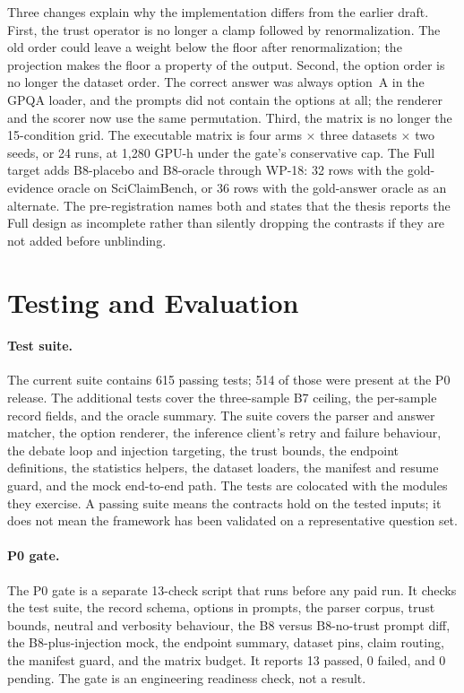 Three changes explain why the implementation differs from the earlier draft. First, the trust operator is no longer a clamp followed by renormalization. The old order could leave a weight below the floor after renormalization; the projection makes the floor a property of the output. Second, the option order is no longer the dataset order. The correct answer was always option~A in the GPQA loader, and the prompts did not contain the options at all; the renderer and the scorer now use the same permutation. Third, the matrix is no longer the 15-condition grid. The executable matrix is four arms $\times$ three datasets $\times$ two seeds, or 24 runs, at 1{,}280 GPU-h under the gate's conservative cap. The Full target adds B8-placebo and B8-oracle through WP-18: 32 rows with the gold-evidence oracle on SciClaimBench, or 36 rows with the gold-answer oracle as an alternate. The pre-registration names both and states that the thesis reports the Full design as incomplete rather than silently dropping the contrasts if they are not added before unblinding.

\section{Testing and Evaluation}\label{sec:testing-evaluation}

\paragraph*{Test suite.}
The current suite contains 615 passing tests; 514 of those were present at the P0 release. The additional tests cover the three-sample B7 ceiling, the per-sample record fields, and the oracle summary. The suite covers the parser and answer matcher, the option renderer, the inference client's retry and failure behaviour, the debate loop and injection targeting, the trust bounds, the endpoint definitions, the statistics helpers, the dataset loaders, the manifest and resume guard, and the mock end-to-end path. The tests are colocated with the modules they exercise. A passing suite means the contracts hold on the tested inputs; it does not mean the framework has been validated on a representative question set.

\paragraph*{P0 gate.}
The P0 gate is a separate 13-check script that runs before any paid run. It checks the test suite, the record schema, options in prompts, the parser corpus, trust bounds, neutral and verbosity behaviour, the B8 versus B8-no-trust prompt diff, the B8-plus-injection mock, the endpoint summary, dataset pins, claim routing, the manifest guard, and the matrix budget. It reports 13 passed, 0 failed, and 0 pending. The gate is an engineering readiness check, not a result.

